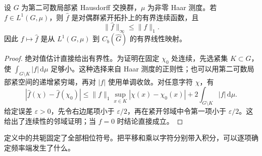 \begin{proposition}[有界性与连续性]
\label{b2:prop:I3-fourier-continuity}
设 \(G\) 为第二可数局部紧 Hausdorff 交换群，\(\mu\) 为非零 Haar 测度。若 \(f\in L^1(G,\mu)\)，则 \(\widehat f\) 是对偶群紧开拓扑上的有界连续函数，且
\[
 \|\widehat f\|_\infty\le\|f\|_1.
\]
因此 \(f\mapsto\widehat f\) 是从 \(L^1(G,\mu)\) 到 \(C_b(\widehat G)\) 的有界线性映射。
\end{proposition}
\begin{proof}
绝对值估计直接给出有界性。为证明在固定 \(\chi_0\) 处连续，先选紧集 \(K\subset G\)，使
\(\int_{G\setminus K}|f|\,\mathrm d\mu\) 足够小。这种选择来自 Haar 测度的正则性；也可以用第二可数局部紧空间的递增紧穷竭，再对 \(|f|\) 使用单调收敛。对任意字符 \(\chi\)，有
\[
 |\widehat f(\chi)-\widehat f(\chi_0)|
 \le\|f\|_1\sup_{x\in K}|\chi(x)-\chi_0(x)|
      +2\int_{G\setminus K}|f|\,\mathrm d\mu.
\]
给定误差 \(\varepsilon>0\)，先令右边尾项小于 \(\varepsilon/2\)，再在紧开邻域中令第一项小于 \(\varepsilon/2\)。这给出了连续性的邻域证明；当 \(f=0\) 时结论直接成立。
\end{proof}

定义中的共轭固定了全部相位符号。把平移和乘以字符分别带入积分，可以逐项确定频率端发生了什么。

